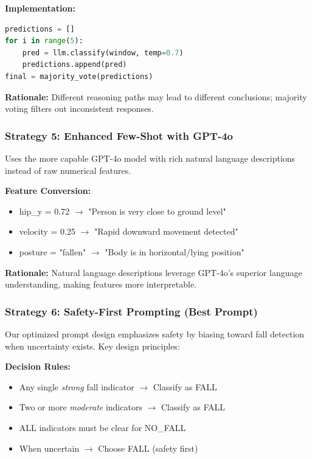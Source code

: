 \documentclass[conference]{IEEEtran}
\begin{document}
\textbf{Implementation:}
\begin{lstlisting}[language=Python]
predictions = []
for i in range(5):
    pred = llm.classify(window, temp=0.7)
    predictions.append(pred)
final = majority_vote(predictions)
\end{lstlisting}

\textbf{Rationale:} Different reasoning paths may lead to different conclusions; majority voting filters out inconsistent responses.

\subsubsection{Strategy 5: Enhanced Few-Shot with GPT-4o}
Uses the more capable GPT-4o model with rich natural language descriptions instead of raw numerical features.

\textbf{Feature Conversion:}
\begin{itemize}[leftmargin=*]
    \item hip\_y = 0.72 $\rightarrow$ "Person is very close to ground level"
    \item velocity = 0.25 $\rightarrow$ "Rapid downward movement detected"
    \item posture = "fallen" $\rightarrow$ "Body is in horizontal/lying position"
\end{itemize}

\textbf{Rationale:} Natural language descriptions leverage GPT-4o's superior language understanding, making features more interpretable.

\subsubsection{Strategy 6: Safety-First Prompting (Best Prompt)}
Our optimized prompt design emphasizes safety by biasing toward fall detection when uncertainty exists. Key design principles:

\textbf{Decision Rules:}
\begin{itemize}[leftmargin=*]
    \item Any single \textit{strong} fall indicator $\rightarrow$ Classify as FALL
    \item Two or more \textit{moderate} indicators $\rightarrow$ Classify as FALL
    \item ALL indicators must be clear for NO\_FALL
    \item When uncertain $\rightarrow$ Choose FALL (safety first)
\end{itemize}
\end{document}
